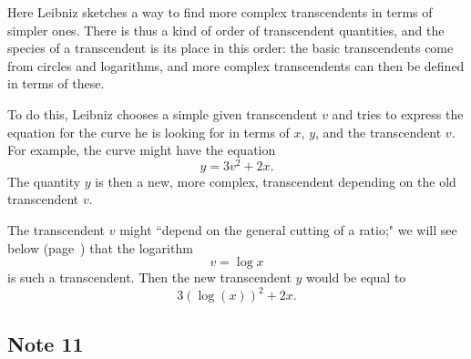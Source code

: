 \documentclass[polutonikogreek,english,twoside,openright]{article}
\begin{document}
Here Leibniz sketches a way to find more complex transcendents in
terms of simpler ones.  There is thus a kind of order of transcendent
quantities, and the species of a transcendent is its place in this
order: the basic transcendents come from circles and logarithms, and
more complex transcendents can then be defined in terms of these.

To do this, Leibniz chooses a simple given transcendent $v$ and tries
to express the equation for the curve he is looking for in terms of
$x$, $y$, and the transcendent $v$.  For example, the curve might have
the equation
$$y = 3v^2 + 2x.$$
The quantity $y$ is then a new, more complex, transcendent depending on the old transcendent $v$.

The transcendent $v$ might ``depend on the general cutting of a
ratio;" we will see below (page~\pageref{begmprop}) that the logarithm
$$v= \log x$$
is such  a transcendent.  Then the new transcendent $y$ would be equal to 
$$3(\log(x))^2 + 2x.$$



\subsection*{Note 11}
\label{crg11}
\end{document}
